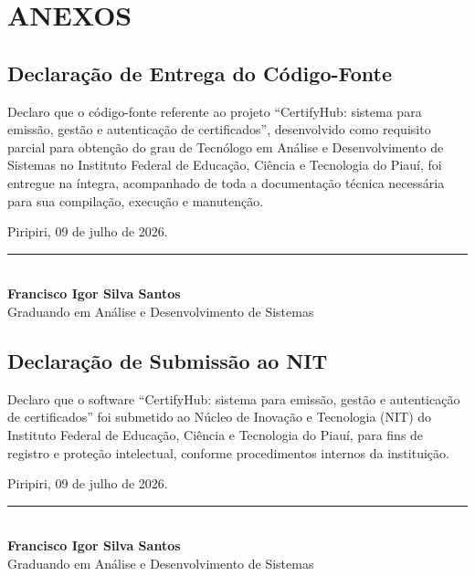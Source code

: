 \section*{ANEXOS}

\subsection{Declaração de Entrega do Código-Fonte}

Declaro que o código-fonte referente ao projeto ``CertifyHub: sistema para emissão, gestão e autenticação de certificados'', desenvolvido como requisito parcial para obtenção do grau de Tecnólogo em Análise e Desenvolvimento de Sistemas no Instituto Federal de Educação, Ciência e Tecnologia do Piauí, foi entregue na íntegra, acompanhado de toda a documentação técnica necessária para sua compilação, execução e manutenção.

\vspace{4cm}

Piripiri, 09 de julho de 2026.

\vspace{2cm}
\begin{flushright}
\rule{8cm}{0.4pt}\\
\textbf{Francisco Igor Silva Santos}\\
Graduando em Análise e Desenvolvimento de Sistemas
\end{flushright}

\newpage

\subsection{Declaração de Submissão ao NIT}

Declaro que o software ``CertifyHub: sistema para emissão, gestão e autenticação de certificados'' foi submetido ao Núcleo de Inovação e Tecnologia (NIT) do Instituto Federal de Educação, Ciência e Tecnologia do Piauí, para fins de registro e proteção intelectual, conforme procedimentos internos da instituição.

\vspace{4cm}

Piripiri, 09 de julho de 2026.

\vspace{2cm}
\begin{flushright}
\rule{8cm}{0.4pt}\\
\textbf{Francisco Igor Silva Santos}\\
Graduando em Análise e Desenvolvimento de Sistemas
\end{flushright}

